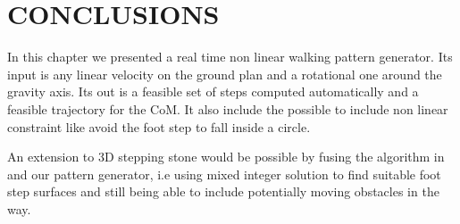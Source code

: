 \section{CONCLUSIONS}

In this chapter we presented a real time non linear walking pattern generator.
Its input is any linear velocity on the ground plan and a rotational one around the gravity axis.
Its out is a feasible set of steps computed automatically and a feasible trajectory for the CoM.
It also include the possible to include non linear constraint like avoid the foot step to fall inside a circle.

An extension to 3D stepping stone would be possible by fusing the algorithm in \cite{Deits:ichr:14} and our pattern generator,
i.e using mixed integer solution to find suitable foot step surfaces and still being able to include potentially moving obstacles in the way.
